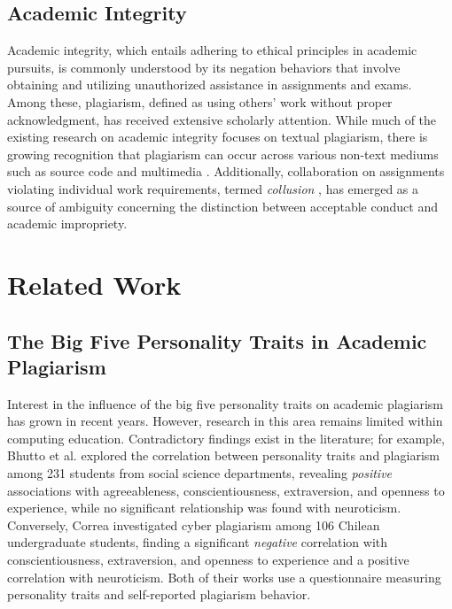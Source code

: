\subsection{Academic Integrity}
Academic integrity, which entails adhering to ethical principles in academic pursuits, is commonly understood by its negation behaviors that involve obtaining and utilizing unauthorized assistance in assignments and exams. Among these, plagiarism, defined as using others' work without proper acknowledgment, has received extensive scholarly attention. While much of the existing research on academic integrity focuses on textual plagiarism, there is growing recognition that plagiarism can occur across various non-text mediums such as source code and multimedia \cite{Marcin2016,10.1145/2526968.2526971}. Additionally, collaboration on assignments violating individual work requirements, termed \textit{collusion} \cite{JonesJuliet}, has emerged as a source of ambiguity concerning the distinction between acceptable conduct and academic impropriety.


\section{Related Work} \label{sec:relatedwork}

\subsection{The Big Five Personality Traits in Academic Plagiarism}

Interest in the influence of the big five personality traits on academic plagiarism has grown in recent years. However, research in this area remains limited within computing education. Contradictory findings exist in the literature; for example, Bhutto et al. \cite{Bhutto2019ACS} explored the correlation between personality traits and plagiarism among 231 students from social science departments, revealing \textit{positive} associations with agreeableness, conscientiousness, extraversion, and openness to experience, while no significant relationship was found with neuroticism. Conversely, Correa \cite{ChileanUniver} investigated cyber plagiarism among 106 Chilean undergraduate students, finding a significant \textit{negative} correlation with conscientiousness, extraversion, and openness to experience and a positive correlation with neuroticism. Both of their works use a questionnaire measuring personality traits and self-reported plagiarism behavior.

